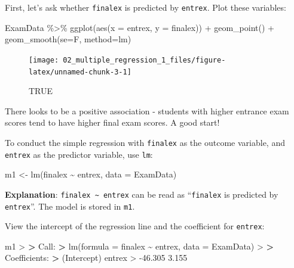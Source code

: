 \documentclass[
]{book}
\newenvironment{Shaded}{\begin{snugshade}}{\end{snugshade}}
\newcommand{\AttributeTok}[1]{\textcolor[rgb]{0.77,0.63,0.00}{#1}}
\newcommand{\ErrorTok}[1]{\textcolor[rgb]{0.64,0.00,0.00}{\textbf{#1}}}
\newcommand{\FloatTok}[1]{\textcolor[rgb]{0.00,0.00,0.81}{#1}}
\newcommand{\FunctionTok}[1]{\textcolor[rgb]{0.00,0.00,0.00}{#1}}
\newcommand{\NormalTok}[1]{#1}
\newcommand{\OtherTok}[1]{\textcolor[rgb]{0.56,0.35,0.01}{#1}}
\newcommand{\SpecialCharTok}[1]{\textcolor[rgb]{0.00,0.00,0.00}{#1}}
\theoremstyle{definition}
\theoremstyle{definition}
\theoremstyle{definition}
\theoremstyle{definition}
\theoremstyle{remark}
\begin{document}
First, let's ask whether \texttt{finalex} is predicted by \texttt{entrex}. Plot these variables:

\begin{Shaded}
\begin{Highlighting}[]
\NormalTok{ExamData }\SpecialCharTok{\%\textgreater{}\%} 
  \FunctionTok{ggplot}\NormalTok{(}\FunctionTok{aes}\NormalTok{(}\AttributeTok{x =}\NormalTok{ entrex, }\AttributeTok{y =}\NormalTok{ finalex)) }\SpecialCharTok{+} 
  \FunctionTok{geom\_point}\NormalTok{() }\SpecialCharTok{+}
  \FunctionTok{geom\_smooth}\NormalTok{(}\AttributeTok{se=}\NormalTok{F, }\AttributeTok{method=}\NormalTok{lm)}
\end{Highlighting}
\end{Shaded}

\begin{figure}

{\centering \texttt{[image: 02\_multiple\_regression\_1\_files/figure-latex/unnamed-chunk-3-1]} 

}

\caption{TRUE}\label{fig:unnamed-chunk-3}
\end{figure}

There looks to be a positive association - students with higher entrance exam scores tend to have higher final exam scores. A good start!

To conduct the simple regression with \texttt{finalex} as the outcome variable, and \texttt{entrex} as the predictor variable, use \texttt{lm}:

\begin{Shaded}
\begin{Highlighting}[]
\NormalTok{m1 }\OtherTok{\textless{}{-}} \FunctionTok{lm}\NormalTok{(finalex }\SpecialCharTok{\textasciitilde{}}\NormalTok{ entrex, }\AttributeTok{data =}\NormalTok{ ExamData) }
\end{Highlighting}
\end{Shaded}

\textbf{Explanation}: \texttt{finalex\ \textasciitilde{}\ entrex} can be read as ``\texttt{finalex} is predicted by \texttt{entrex}''. The model is stored in \texttt{m1}.

View the intercept of the regression line and the coefficient for \texttt{entrex}:

\begin{Shaded}
\begin{Highlighting}[]
\NormalTok{m1}
\SpecialCharTok{\textgreater{}} 
\ErrorTok{\textgreater{}}\NormalTok{ Call}\SpecialCharTok{:}
\ErrorTok{\textgreater{}} \FunctionTok{lm}\NormalTok{(}\AttributeTok{formula =}\NormalTok{ finalex }\SpecialCharTok{\textasciitilde{}}\NormalTok{ entrex, }\AttributeTok{data =}\NormalTok{ ExamData)}
\SpecialCharTok{\textgreater{}} 
\ErrorTok{\textgreater{}}\NormalTok{ Coefficients}\SpecialCharTok{:}
\ErrorTok{\textgreater{}}\NormalTok{ (Intercept)       entrex  }
\SpecialCharTok{\textgreater{}}     \SpecialCharTok{{-}}\FloatTok{46.305}        \FloatTok{3.155}
\end{Highlighting}
\end{Shaded}
\end{document}
